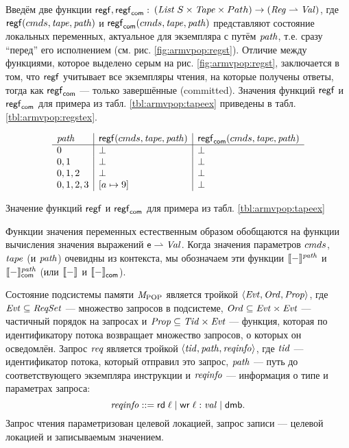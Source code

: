 Введём две функции
$\mathsf{regf}, \mathsf{regf}_\mathsf{com}:$
$(\mathit{List}\;{S} \times \mathit{Tape} \times Path) \rightarrow (\mathit{Reg} \rightharpoonup \mathit{Val})$,
где $\mathsf{regf}({cmds},\mathit{tape},\mathit{path})$ и $\mathsf{regf}_\mathsf{com}({cmds},\mathit{tape},\mathit{path})$
представляют состояние локальных переменных, актуальное для экземпляра с путём $\mathit{path}$,
т.е. сразу ``перед'' его исполнением (см. рис. \ref{fig:armvpop:regst}).
Отличие между функциями, которое выделено серым на рис. \ref{fig:armvpop:regst},
заключается в том, что $\mathsf{regf}$ учитывает все экземпляры чтения,
на которые получены ответы, тогда как $\mathsf{regf}_\mathsf{com}$ --- только завершённые (committed).
Значения функций $\mathsf{regf}$ и $\mathsf{regf}_\mathsf{com}$ для примера из табл. \ref{tbl:armvpop:tapeex}
приведены в табл. \ref{tbl:armvpop:regstex}.

\begin{table}
\[
\begin{array}{l | l | l}
\mathit{path} & \mathsf{regf}({cmds}, \mathit{tape}, \mathit{path}) & \mathsf{regf}_\mathsf{com}({cmds}, \mathit{tape}, \mathit{path})\\
\hline
 0       & \bot & \bot \\
 0,1     & \bot & \bot \\
 0,1,2   & \bot & \bot  \\
 0,1,2,3 & [a \mapsto 9] & \bot \\
\end{array}
\]
  \caption{Значение функций $\mathsf{regf}$ и $\mathsf{regf}_\mathsf{com}$ для примера из табл. \ref{tbl:armvpop:tapeex}}
  \label{tbl:armvpop:regstex}
\end{table}

Функции значения переменных естественным образом обобщаются на функции вычисления
значения выражений $\mathsf{e} \rightharpoonup \mathit{Val}$.
Когда значения параметров ${cmds}$, $\mathit{tape}$ (и $\mathit{path}$) очевидны из контекста,
мы обозначаем эти функции $\llbracket-\rrbracket ^{\mathit{path}}$ и $\llbracket-\rrbracket ^{\mathit{path}}_\mathsf{com}$
(или $\llbracket-\rrbracket ^{}$ и $\llbracket-\rrbracket ^{}_\mathsf{com}$).

Состояние подсистемы памяти $\mathit{M}_{\mathrm{POP}}$ является тройкой $\langle  \mathit{Evt}, \mathit{Ord}, \mathit{Prop}  \rangle$, где
$\mathit{Evt} \subseteq \mathit{ReqSet}$ --- множество запросов в подсистеме,
$\mathit{Ord} \subseteq \mathit{Evt} \times \mathit{Evt}$ --- частичный порядок на запросах и
$\mathit{Prop} \subseteq  \mathit{Tid} \times \mathit{Evt}$ --- функция, которая по идентификатору потока возвращает
множество запросов, о которых он осведомлён.
Запрос $\textit{req}$ является тройкой $\langle \mathit{tid}, \mathit{path}, \mathit{reqinfo} \rangle$, где
$\mathit{tid}$ --- идентификатор потока, который отправил это запрос,
$\mathit{path}$ --- путь до соответствующего экземпляра инструкции и
$\mathit{reqinfo}$ --- информация о типе и параметрах запроса:
\[ \mathit{reqinfo} ::= {\sf rd} \; \ell \mid {\sf wr} \; \ell:\mathit{val} \mid {\sf dmb}.\]
Запрос чтения параметризован целевой локацией, запрос записи --- целевой
локацией и записываемым значением.

